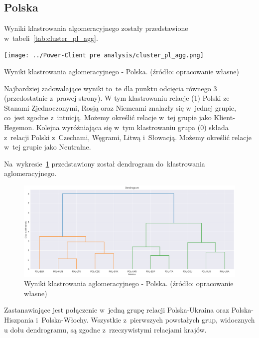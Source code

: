 \documentclass[11pt]{report}
\begin{document}
    \subsection{Polska}
    Wyniki klastrowania algomeracyjnego zostały przedstawione w~tabeli~\ref{tab:cluster_pl_agg}.

    \begin{table}[tp]
        \centering
        \texttt{[image: ../Power-Client pre analysis/cluster\_pl\_agg.png]}
        \caption{Wyniki klastrowania aglomeracyjnego - Polska. (źródło: opracowanie własne)}
        \label{tab:cluster_pl_agg}
    \end{table}

    Najbardziej zadowalające wyniki to~te dla punktu odcięcia równego 3 (przedostatnie z~prawej strony).
    W tym klastrowaniu relacje (1) Polski ze Stanami Zjednoczonymi, Rosją oraz Niemcami znalazły się w~jednej grupie,
    co~jest zgodne z~intuicją.
    Możemy określić relacje w~tej grupie jako Klient-Hegemon.
    Kolejna wyróżniająca się w~tym klastrowaniu grupa (0) składa z~relacji Polski z~Czechami, Węgrami, Litwą i~Słowacją.
    Możemy określić relacje w~tej grupie jako Neutralne.

    Na~wykresie~\ref{fig:cluster_pl_agg_dendrogram} przedstawiony został dendrogram do~klastrowania aglomeracyjnego.

    \begin{figure}[tp]
        \centering
        \includegraphics[width=\linewidth]{../Power-Client pre analysis/cluster_pl_agg_dendrogram.png}
        \caption{Wyniki klastrowania aglomeracyjnego - Polska. (źródło: opracowanie własne)}
        \label{fig:cluster_pl_agg_dendrogram}
    \end{figure}

    Zastanawiające jest połączenie w~jedną grupę relacji Polska-Ukraina oraz Polska-Hiszpania i~Polska-Włochy.
    Wszystkie z~pierwszych powstałych grup, widocznych u dołu dendrogramu, są zgodne z~rzeczywistymi relacjami krajów.
\end{document}
